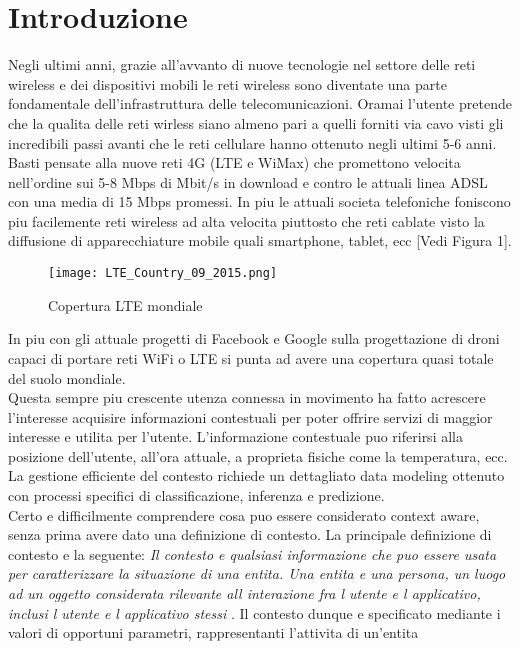 \chapter*{Introduzione}
Negli ultimi anni, grazie all'avvanto di nuove tecnologie nel settore delle reti wireless
e dei dispositivi mobili le reti wireless sono diventate una parte fondamentale
dell'infrastruttura delle telecomunicazioni. Oramai l'utente pretende che la qualita
delle reti wirless siano almeno pari a quelli forniti via cavo visti gli incredibili passi avanti
che le reti cellulare hanno ottenuto negli ultimi 5-6 anni.
Basti pensate alla nuove reti 4G (LTE e WiMax) che promettono velocita nell'ordine sui 5-8 Mbps
di Mbit/s in download e contro le attuali linea ADSL con una media di 15 Mbps promessi.
In piu le attuali societa telefoniche foniscono piu facilemente reti wireless ad alta velocita
piuttosto che reti cablate visto la diffusione di apparecchiature mobile quali smartphone, tablet, ecc [Vedi Figura 1].
\begin{figure}
\begin{center}
\texttt{[image: LTE\_Country\_09\_2015.png]}
\caption[Cop LTE]{Copertura LTE mondiale}
\label{etichetta}
\end{center}
\end{figure}
In piu con gli attuale progetti di Facebook e Google sulla progettazione di droni capaci di portare
reti WiFi o LTE si punta ad avere una copertura quasi totale del suolo mondiale.\\
Questa sempre piu crescente utenza connessa in movimento ha fatto acrescere l'interesse
acquisire informazioni contestuali per poter offrire servizi di maggior interesse e utilita
per l'utente. L'informazione contestuale puo riferirsi alla posizione dell'utente, all'ora attuale,
a proprieta fisiche come la temperatura, ecc.
La gestione efficiente del contesto richiede un dettagliato data modeling ottenuto
con processi specifici di classificazione, inferenza e predizione.\\
Certo e difficilmente comprendere cosa puo essere considerato context aware,
senza prima avere dato una definizione di contesto. La principale definizione
di contesto e la seguente:
\textit{Il contesto e qualsiasi informazione che puo essere usata per caratterizzare
la situazione di una entita. Una entita e una persona, un luogo ad un oggetto considerata rilevante all interazione fra l utente
e l applicativo, inclusi l utente e l applicativo stessi}
\cite{cit_48}. Il contesto dunque e specificato
mediante i valori di opportuni parametri, rappresentanti l'attivita di un'entita

